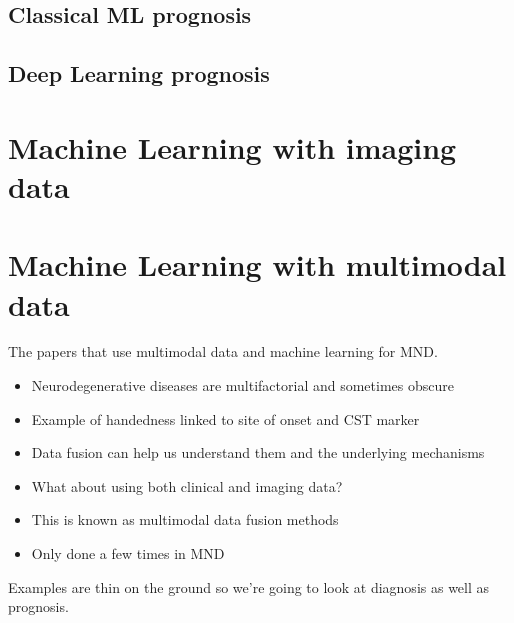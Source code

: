 \subsection{Classical ML prognosis}

\subsection{Deep Learning prognosis}

\section{Machine Learning with imaging data}


\section{Machine Learning with multimodal data}

The papers that use multimodal data and machine learning for MND.
\begin{itemize}
    \item Neurodegenerative diseases are multifactorial and sometimes obscure
    \item Example of handedness linked to site of onset and CST marker
    \item Data fusion can help us understand them and the underlying mechanisms
    \item What about using both clinical and imaging data?
    \item This is known as multimodal data fusion methods
    \item Only done a few times in MND
\end{itemize}

Examples are thin on the ground so we're going to look at diagnosis as well as prognosis.



